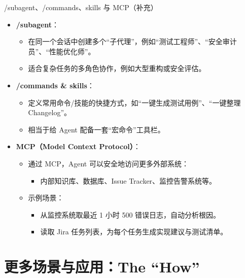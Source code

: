 \documentclass[aspectratio=169]{beamer}
\begin{document}
\begin{frame}{/subagent、/commands、skills 与 MCP（补充）}
  \begin{itemize}
    \item \textbf{/subagent}：
      \begin{itemize}
        \item 在同一个会话中创建多个“子代理”，例如“测试工程师”、“安全审计员”、“性能优化师”。
        \item 适合复杂任务的多角色协作，例如大型重构或安全评估。
      \end{itemize}
    \item \textbf{/commands \& skills}：
      \begin{itemize}
        \item 定义常用命令/技能的快捷方式，如“一键生成测试用例”、“一键整理 Changelog”。
        \item 相当于给 Agent 配备一套“宏命令”工具栏。
      \end{itemize}
    \item \textbf{MCP（Model Context Protocol）}：
      \begin{itemize}
        \item 通过 MCP，Agent 可以安全地访问更多外部系统：
          \begin{itemize}
            \item 内部知识库、数据库、Issue Tracker、监控告警系统等。
          \end{itemize}
        \item 示例场景：
          \begin{itemize}
            \item 从监控系统取最近 1 小时 500 错误日志，自动分析根因。
            \item 读取 Jira 任务列表，为每个任务生成实现建议与测试清单。
          \end{itemize}
      \end{itemize}
  \end{itemize}
\end{frame}

\section{更多场景与应用：The ``How''}
\end{document}
